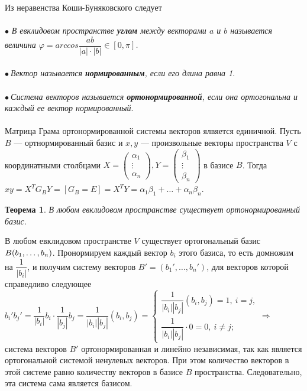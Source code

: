 Из неравенства Коши-Буняковского следует\\\\
$\bullet$ \textit{В евклидовом пространстве \textbf{углом} между векторами $a$ и $b$ называется величина $\varphi = arccos\dfrac{ab}{|a|\cdot|b|}\in [0, \pi]$.}\\\\
$\bullet\ $\textit{Вектор называется \textbf{ нормированным}, если его длина равна 1}.\\\\
$\bullet\ $\textit{Система векторов называется \textbf{ортонормированной}, если она ортогональна и каждый ее вектор нормированный}.\\\\
Матрица Грама ортонормированной системы векторов ялвяется единичной. Пусть $B$ --- ортнормированный базис и $x,y$ --- произвольные векторы пространства $V$ с координатными столбцами $X = \begin{pmatrix}
	\alpha_1\\ \vdots \\ \alpha_n
\end{pmatrix}, Y = \begin{pmatrix}
	\beta_1\\ \vdots \\ \beta_n
\end{pmatrix}$ в базисе $B$. Тогда $xy = X^TG_BY = [G_B = E] = X^T Y = \alpha_1 \beta_1 + \ldots + \alpha_n \beta_n$.
\newtheorem*{th14_3_1}{Теорема}\begin{th14_3_1}В любом евклидовом пространстве существует ортонормированный базис.
\end{th14_3_1}\begin{Proof}
	В любом евклидовом пространстве $V$ существует ортогональный базис $B(b_1,\dots,b_n)$. Пронормируем каждый вектор $b_i$ этого базиса, то есть домножим на $\dfrac{1}{|b_i|}$, и получим систему векторов $B'=(b_1',\dots,b_n')$, для векторов которой справедливо следующее\\
	$b_i' b_j'=\dfrac{1}{|b_i|}b_i \cdot \dfrac{1}{|b_j|}b_j=\dfrac{1}{|b_i||b_j|} (b_i, b_j) = \begin{cases}
		\dfrac{1}{|b_i||b_j|} (b_i, b_j) = 1,\ i = j,\\
		\dfrac{1}{|b_i||b_j|}\cdot 0 = 0,\ i\ne j;
	\end{cases} \Rightarrow$ система векторов $B'$ ортонормированная и  линейно независимая, так как является ортогональной системой ненулевых векторов. При этом количество векторов в этой системе равно количеству векторов в базисе $B$ пространства. Следовательно, эта система сама является базисом.
\end{Proof}\\\\
